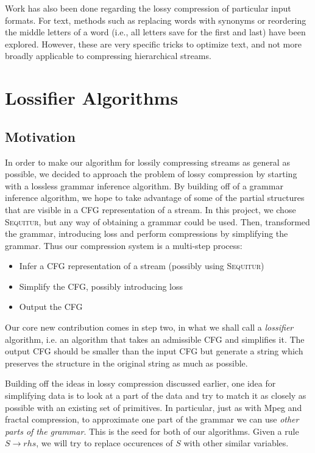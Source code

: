 \documentclass[11pt]{article}
\newcommand{\Sequitur}{\textsc{Sequitur}\xspace}
\begin{document}
Work has also been done regarding the lossy compression of particular input
formats.  For text, methods such as replacing words with synonyms
\cite{semanticlossy} or reordering the middle letters of a word (i.e., all
letters save for the first and last) \cite{semilossless} have been explored.
However, these are very specific tricks to optimize text, and not more broadly
applicable to compressing hierarchical streams.

\section{Lossifier Algorithms}

\subsection{Motivation}

In order to make our algorithm for lossily compressing streams as general as
possible, we decided to approach the problem of lossy compression by starting
with a lossless grammar inference algorithm.  By building off of a grammar
inference algorithm, we hope to take advantage of some of the partial
structures that are visible in a CFG representation of a stream.  In this
project, we chose \Sequitur, but any way of obtaining a grammar could be used.
Then, transformed the grammar, introducing loss and perform compressions by
simplifying the grammar. Thus our compression system is a multi-step process:

\begin{itemize}
  \item Infer a CFG representation of a stream (possibly using \Sequitur)
  \item Simplify the CFG, possibly introducing loss
  \item Output the CFG
\end{itemize}

Our core new contribution comes in step two, in what we shall call a
\emph{lossifier} algorithm, i.e. an algorithm that takes an admissible CFG and
simplifies it. The output CFG should be smaller than the input CFG but generate
a string which preserves the structure in the original string as much as
possible.

Building off the ideas in lossy compression discussed earlier, one idea for
simplifying data is to look at a part of the data and try to match it as
closely as possible with an existing set of primitives. In particular, just as
with Mpeg and fractal compression, to approximate one part of the grammar we
can use \emph{other parts of the grammar}. This is the seed for both of our
algorithms. Given a rule $S \rightarrow rhs$, we will try to replace occurences
of $S$ with other similar variables.
\end{document}
